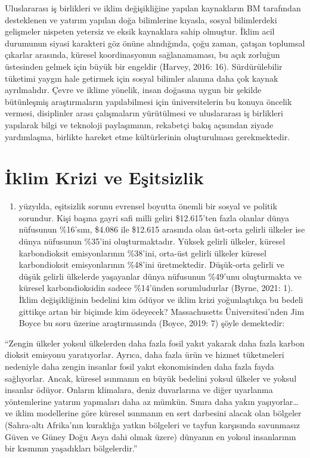 \documentclass[
]{book}
\providecommand{\tightlist}{%
  \setlength{\itemsep}{0pt}\setlength{\parskip}{0pt}}
\begin{document}
Uluslararası iş birlikleri ve iklim değişikliğine yapılan kaynakların BM tarafından desteklenen ve yatırım yapılan doğa bilimlerine kıyasla, sosyal bilimlerdeki gelişmeler nispeten yetersiz ve eksik kaynaklara sahip olmuştur. İklim acil durumunun siyasi karakteri göz önüne alındığında, çoğu zaman, çatışan toplumsal çıkarlar arasında, küresel koordinasyonun sağlanamaması, bu açık zorluğun üstesinden gelmek için büyük bir engeldir (Harvey, 2016: 16). Sürdürülebilir tüketimi yaygın hale getirmek için sosyal bilimler alanına daha çok kaynak ayrılmalıdır. Çevre ve iklime yönelik, insan doğasına uygun bir şekilde bütünleşmiş araştırmaların yapılabilmesi için üniversitelerin bu konuya öncelik vermesi, disiplinler arası çalışmaların yürütülmesi ve uluslararası iş birlikleri yapılarak bilgi ve teknoloji paylaşımının, rekabetçi bakış açısından ziyade yardımlaşma, birlikte hareket etme kültürlerinin oluşturulması gerekmektedir.

\hypertarget{iklim-krizi-ve-eux15fitsizlik}{%
\section{İklim Krizi ve Eşitsizlik}\label{iklim-krizi-ve-eux15fitsizlik}}

\begin{enumerate}
\def\labelenumi{\arabic{enumi}.}
\setcounter{enumi}{20}
\tightlist
\item
  yüzyılda, eşitsizlik sorunu evrensel boyutta önemli bir sosyal ve politik sorundur. Kişi başına gayri safi milli geliri \$12.615'ten fazla olanlar dünya nüfusunun \%16'sını, \$4.086 ile \$12.615 arasında olan üst-orta gelirli ülkeler ise dünya nüfusunun \%35'ini oluşturmaktadır. Yüksek gelirli ülkeler, küresel karbondioksit emisyonlarının \%38'ini, orta-üst gelirli ülkeler küresel karbondioksit emisyonlarının \%48'ini üretmektedir. Düşük-orta gelirli ve düşük gelirli ülkelerde yaşayanlar dünya nüfusunun \%49'unu oluşturmakta ve küresel karbondioksidin sadece \%14'ünden sorumludurlar (Byrne, 2021: 1). İklim değişikliğinin bedelini kim ödüyor ve iklim krizi yoğunlaştıkça bu bedeli gittikçe artan bir biçimde kim ödeyecek? Massachusetts Üniversitesi'nden Jim Boyce bu soru üzerine araştırmasında (Boyce, 2019: 7) şöyle demektedir:
\end{enumerate}

``Zengin ülkeler yoksul ülkelerden daha fazla fosil yakıt yakarak daha fazla karbon dioksit emisyonu yaratıyorlar. Ayrıca, daha fazla ürün ve hizmet tüketmeleri nedeniyle daha zengin insanlar fosil yakıt ekonomisinden daha fazla fayda sağlıyorlar. Ancak, küresel ısınmanın en büyük bedelini yoksul ülkeler ve yoksul insanlar ödüyor. Onların klimalara, deniz duvarlarına ve diğer uyarlanma yöntemlerine yatırım yapmaları daha az mümkün. Sınıra daha yakın yaşıyorlar\ldots{} ve iklim modellerine göre küresel ısınmanın en sert darbesini alacak olan bölgeler (Sahra-altı Afrika'nın kuraklığa yatkın bölgeleri ve tayfun karşısında savunmasız Güven ve Güney Doğu Asya dahi olmak üzere) dünyanın en yoksul insanlarının bir kısmının yaşadıkları bölgelerdir.''
\end{document}
